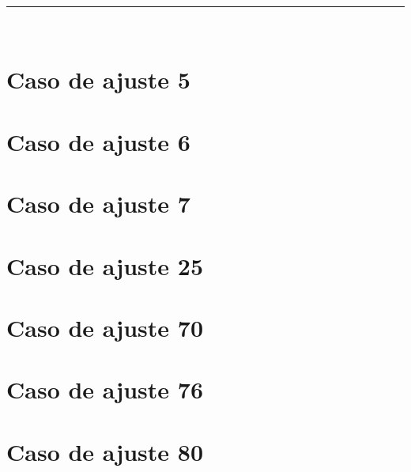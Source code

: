 
\begin{center}
	{\fboxrule=4pt } \\
	\setcounter{chapter}{5}
	\setcounter{section}{0}
	\rule{15cm}{0pt} \\
\end{center}

\section{Caso de ajuste 5}

\section{Caso de ajuste 6}

\section{Caso de ajuste 7}

\section{Caso de ajuste 25}

\section{Caso de ajuste 70}

\section{Caso de ajuste 76}

\section{Caso de ajuste 80}